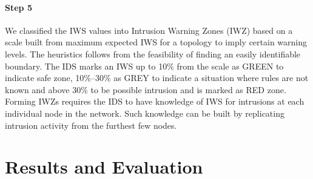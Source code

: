 \documentclass{CRPITStyle}
\begin{document}
\paragraph*{Step 5}  We classified the IWS values into Intrusion Warning Zones (IWZ) based on a scale built from maximum expected IWS for a topology to imply certain warning levels.
The heuristics follows from %
the feasibility of finding an easily identifiable boundary.
The IDS marks an IWS up to 10\% from the scale as GREEN to indicate safe zone,
10\%--30\% as GREY to indicate a situation where rules are not known and 
above 30\% to be possible intrusion and is marked as RED zone.
Forming IWZs requires the IDS to have knowledge of IWS for  intrusions at each individual node in the network.
Such knowledge can be built by replicating intrusion activity from the furthest few nodes.

\section{Results and Evaluation}
\label{sec:eval}
\end{document}
